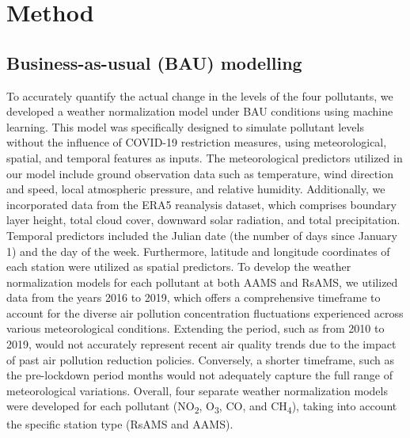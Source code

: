 \section{Method} \label{chap4_method}
\subsection{Business-as-usual (BAU) modelling}
To accurately quantify the actual change in the levels of the four pollutants, we developed a weather normalization model under BAU conditions using machine learning. This model was specifically designed to simulate pollutant levels without the influence of COVID-19 restriction measures, using meteorological, spatial, and temporal features as inputs. The meteorological predictors utilized in our model include ground observation data such as temperature, wind direction and speed, local atmospheric pressure, and relative humidity. Additionally, we incorporated data from the ERA5 reanalysis dataset, which comprises boundary layer height, total cloud cover, downward solar radiation, and total precipitation. Temporal predictors included the Julian date (the number of days since January 1) and the day of the week. Furthermore, latitude and longitude coordinates of each station were utilized as spatial predictors. To develop the weather normalization models for each pollutant at both AAMS and RsAMS, we utilized data from the years 2016 to 2019, which offers a comprehensive timeframe to account for the diverse air pollution concentration fluctuations experienced across various meteorological conditions. Extending the period, such as from 2010 to 2019, would not accurately represent recent air quality trends due to the impact of past air pollution reduction policies. Conversely, a shorter timeframe, such as the pre-lockdown period months would not adequately capture the full range of meteorological variations. Overall, four separate weather normalization models were developed for each pollutant (NO\textsubscript{2}, O\textsubscript{3}, CO, and CH\textsubscript{4}), taking into account the specific station type (RsAMS and AAMS). \par


